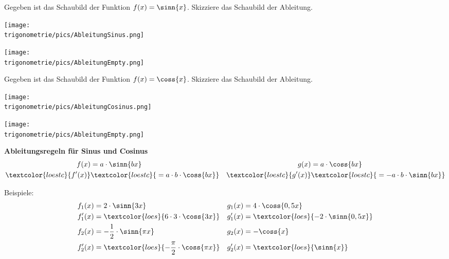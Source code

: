 Gegeben ist das Schaubild der Funktion \(f(x)=\sinn{x}\). Skizziere das Schaubild der Ableitung.

\begin{minipage}{\textwidth}
	\texttt{[image: \\trigonometrie/pics/AbleitungSinus.png]}
\end{minipage}%

\medskip

\begin{minipage}{\textwidth}
	\texttt{[image: \\trigonometrie/pics/AbleitungEmpty.png]}
\end{minipage}%

\vspace{\baselineskip}

Gegeben ist das Schaubild der Funktion \(f(x)=\coss{x}\). Skizziere das Schaubild der Ableitung.

\begin{minipage}{\textwidth}
	\texttt{[image: \\trigonometrie/pics/AbleitungCosinus.png]}
\end{minipage}%

\medskip

\begin{minipage}{\textwidth}
	\texttt{[image: \\trigonometrie/pics/AbleitungEmpty.png]}
\end{minipage}%

\newpage

\begin{tcolorbox}
	\textbf{Ableitungsregeln für Sinus und Cosinus}
		\begin{align*}
			f(x)&=a\cdot\sinn{bx}&g(x)&=a\cdot\coss{bx}\\
			\textcolor{loestc}{f'(x)}&\textcolor{loestc}{\;=a\cdot b\cdot\coss{bx}}&\textcolor{loestc}{g'(x)}&\textcolor{loestc}{\;=-a\cdot b\cdot\sinn{bx}}
		\end{align*}

        \bigskip

\end{tcolorbox}
Beispiele:
\begin{align*}
	f_1(x)&=2\cdot\sinn{3x}&g_1(x)&=4\cdot\coss{0,5x}\\
	f_1'(x)&=\textcolor{loes}{6\cdot 3\cdot\coss{3x}}&g_1'(x)&=\textcolor{loes}{-2\cdot\sinn{0,5x}}\\
	f_2(x)&=-\frac{1}{2}\cdot\sinn{\pi x}&g_2(x)&=-\coss{x}\\
	f_2'(x)&=\textcolor{loes}{-\frac{\pi}{2}\cdot\coss{\pi x}}&g_2'(x)&=\textcolor{loes}{\sinn{x}}
\end{align*}


